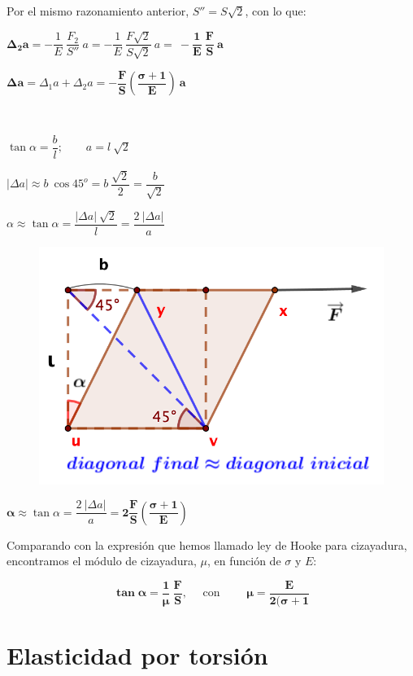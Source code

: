 Por el mismo razonamiento anterior, $S''=S \sqrt{2}$, con lo que:

$\boldsymbol{\Delta_2 a}=-\dfrac 1 E \ \dfrac {F_2} {S''} \ a = -\dfrac 1 E \ \dfrac{F \sqrt 2}{S \sqrt 2} \ a =\boldsymbol{\ - \dfrac 1 E \ \dfrac {F}{S} \ a}$

$\boldsymbol{\Delta a=}\Delta_1 a+\Delta_2 a=\boldsymbol{-\dfrac F S \left( \dfrac{\sigma+1}{E} \right) \ a}$

\begin{multicols}{2}
$\quad$

$\tan \alpha = \dfrac b l; \qquad a=l\ \sqrt 2$

$|\Delta a|\approx b \ \cos 45^o=b\ \dfrac{\sqrt 2}2=\dfrac b {\sqrt 2}$

$\alpha \approx \tan \alpha = \dfrac{|\Delta a|\ \sqrt 2}{l}=\dfrac{2\ |\Delta a|}{a}$
\begin{figure}[H]
	\centering
	\includegraphics[width=.5\textwidth]{imagenes/imagenes09/T09IM06.png}
\end{figure}	
\end{multicols}

$\boldsymbol{ \alpha }\approx \tan \alpha = \dfrac{2\ |\Delta a|}{a}  \boldsymbol{=2 \dfrac F S \left( \dfrac {\sigma +1}{E} \right) }$

Comparando con la expresión que hemos llamado ley de Hooke para cizayadura, encontramos el módulo de cizayadura, $\mu$, en función de $\sigma$ y $E$:

$$\boldsymbol{ \tan \alpha = \dfrac 1 \mu \ \dfrac F S }, \quad \text{ con } \qquad \boldsymbol{ \mu=\dfrac{E}{2(\sigma + 1} }$$


\section{Elasticidad por torsión}

